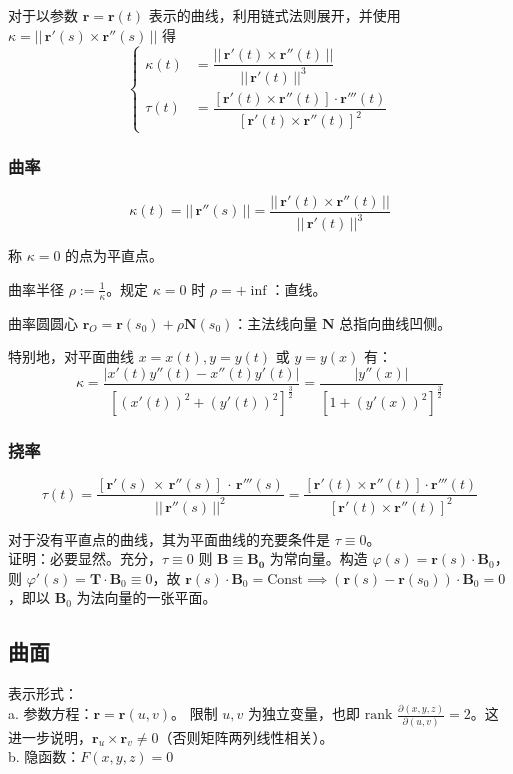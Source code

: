 \documentclass[12pt, a4paper, UTF8, openany]{ctexbook}
\newcommand{\mat}[1]{\mathbf{#1}}
\newcommand{\len}[1]{||\, #1 \,||}%
\begin{document}
        对于以参数 $\mat{r} = \mat{r}(t)$ 表示的曲线，利用链式法则展开，并使用 $\kappa = \len{\mat{r}'(s) \times \mat{r}''(s)}$ 得
        $$\begin{cases}
            \kappa(t) &= \dfrac{\len{\mat{r}'(t) \times \mat{r}''(t)}}{\len{\mat{r}'(t)}^3} \\
            \tau(t) &= \dfrac{[\mat{r}'(t) \times \mat{r}''(t)] \cdot \mat{r}'''(t)}{[\mat{r}'(t) \times \mat{r}''(t)]^2}
        \end{cases}$$

        \subsubsection{曲率}
        $$\kappa(t) = \boxed{\len{\mat{r}''(s)}} = \frac{\len{\mat{r}'(t) \times \mat{r}''(t)}}{\len{\mat{r}'(t)}^3}$$

        称 $\kappa = 0$ 的点为平直点。

        曲率半径 $\rho := \frac{1}{\kappa}$。规定 $\kappa = 0$ 时 $\rho = +\inf$：直线。
        
        曲率圆圆心 $\mat{r}_O = \mat{r}(s_0) + \rho \mat{N}(s_0)$：主法线向量 $\mat{N}$ 总指向曲线凹侧。

        特别地，对平面曲线 $x = x(t), y = y(t)$ 或 $y = y(x)$ 有：
        $$\kappa = \frac{|x'(t)y''(t) - x''(t)y'(t)|}{[(x'(t))^2 + (y'(t))^2]^{\frac{3}{2}}} = \frac{|y''(x)|}{[1 + (y'(x))^2]^{\frac{3}{2}}}$$

        \subsubsection{挠率}
        $$\tau(t) = \dfrac{[\mat{r}'(s) \, \times \, \mat{r}''(s)] \, \cdot \, \mat{r}'''(s)}{\len{\mat{r}''(s)}^2} = \dfrac{[\mat{r}'(t) \times \mat{r}''(t)] \cdot \mat{r}'''(t)}{[\mat{r}'(t) \times \mat{r}''(t)]^2}$$

        对于没有平直点的曲线，其为平面曲线的充要条件是 $\tau \equiv 0$。\\
        证明：必要显然。充分，$\tau \equiv 0$ 则 $\mat{B} \equiv \mat{B_0}$ 为常向量。构造 $\varphi(s) = \mat{r}(s) \cdot \mat{B}_0$，则 $\varphi'(s) = \mat{T} \cdot \mat{B}_0 \equiv 0$，故 $\mat{r}(s) \cdot \mat{B}_0 = \text{Const} \implies (\mat{r}(s) - \mat{r}(s_0)) \cdot \mat{B}_0 = 0$，即以 $\mat{B}_0$ 为法向量的一张平面。

        \subsection{曲面}
        表示形式：\\
        a. 参数方程：$\mat{r} = \mat{r}(u, v)$。
        限制 $u, v$ 为独立变量，也即 $\text{rank } \frac{\partial (x, y, z)}{\partial (u, v)} = 2$。这进一步说明，$\mat{r}_u \times \mat{r}_v \neq 0$（否则矩阵两列线性相关）。\\
        b. 隐函数：$F(x, y, z) = 0$
\end{document}
